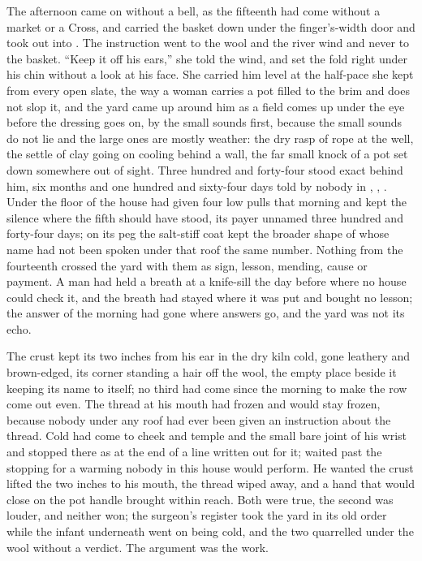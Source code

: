 The afternoon came on without a bell, as the fifteenth had come without a market or a Cross, and  carried the basket down under the finger's-width door and took  out into . The instruction went to the wool and the river wind and never to the basket. “Keep it off his ears,” she told the wind, and set the fold right under his chin without a look at his face. She carried him level at the half-pace she kept from every open slate, the way a woman carries a pot filled to the brim and does not slop it, and the yard came up around him as a field comes up under the eye before the dressing goes on, by the small sounds first, because the small sounds do not lie and the large ones are mostly weather: the dry rasp of rope at the well, the settle of clay going on cooling behind a wall, the far small knock of a pot set down somewhere out of sight. Three hundred and forty-four stood exact behind him, six months and one hundred and sixty-four days told by nobody in , , . Under the floor of the house  had given four low pulls that morning and kept the silence where the fifth should have stood, its payer unnamed three hundred and forty-four days; on its peg the salt-stiff coat kept the broader shape of  whose name had not been spoken under that roof the same number. Nothing from the fourteenth crossed the yard with them as sign, lesson, mending, cause or payment. A man had held a breath at a knife-sill the day before where no house could check it, and the breath had stayed where it was put and bought no lesson; the answer of the morning had gone where answers go, and the yard was not its echo.

The crust kept its two inches from his ear in the dry kiln cold, gone leathery and brown-edged, its corner standing a hair off the wool, the empty place beside it keeping its name to itself; no third had come since the morning to make the row come out even. The thread at his mouth had frozen and would stay frozen, because nobody under any roof had ever been given an instruction about the thread. Cold had come to cheek and temple and the small bare joint of his wrist and stopped there as at the end of a line written out for it;  waited past the stopping for a warming nobody in this house would perform. He wanted the crust lifted the two inches to his mouth, the thread wiped away, and a hand that would close on the pot handle brought within reach. Both were true, the second was louder, and neither won; the surgeon's register took the yard in its old order while the infant underneath went on being cold, and the two quarrelled under the wool without a verdict. The argument was the work.

